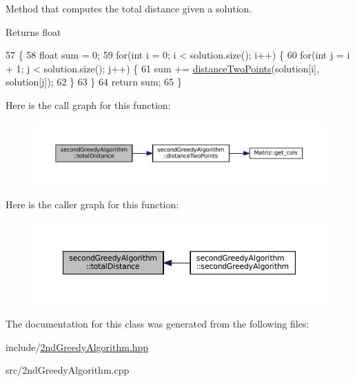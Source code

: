 Method that computes the total distance given a solution. 

\begin{DoxyReturn}{Returns}
float 
\end{DoxyReturn}

\begin{DoxyCode}
57                                                                   \{
58   \textcolor{keywordtype}{float} sum = 0;
59   \textcolor{keywordflow}{for}(\textcolor{keywordtype}{int} i = 0; i < solution.size(); i++) \{
60     \textcolor{keywordflow}{for}(\textcolor{keywordtype}{int} j = i + 1; j < solution.size(); j++) \{
61       sum += \hyperlink{classsecondGreedyAlgorithm_a72574b0ef83083f7994af0eb4007cf39}{distanceTwoPoints}(solution[i], solution[j]);
62     \}
63   \}
64   \textcolor{keywordflow}{return} sum;
65 \}
\end{DoxyCode}
Here is the call graph for this function\+:
\nopagebreak
\begin{figure}[H]
\begin{center}
\leavevmode
\includegraphics[width=350pt]{classsecondGreedyAlgorithm_a21a936acf628b02184e745faf918618a_cgraph}
\end{center}
\end{figure}
Here is the caller graph for this function\+:
\nopagebreak
\begin{figure}[H]
\begin{center}
\leavevmode
\includegraphics[width=350pt]{classsecondGreedyAlgorithm_a21a936acf628b02184e745faf918618a_icgraph}
\end{center}
\end{figure}


The documentation for this class was generated from the following files\+:\begin{DoxyCompactItemize}
\item 
include/\hyperlink{2ndGreedyAlgorithm_8hpp}{2nd\+Greedy\+Algorithm.\+hpp}\item 
src/2nd\+Greedy\+Algorithm.\+cpp\end{DoxyCompactItemize}
